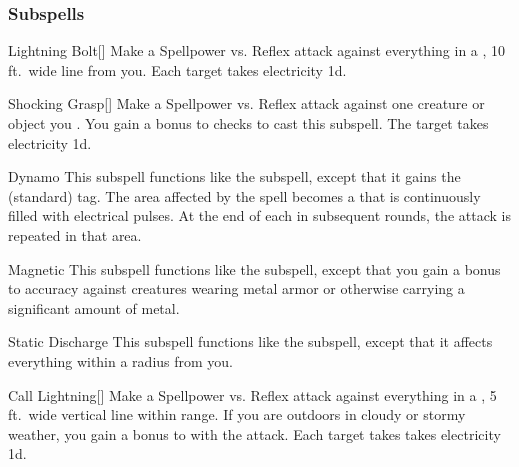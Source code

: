 \subsubsection{Subspells}


\begin{ability}[\nth{1}]{Lightning Bolt}[]
Make a Spellpower vs. Reflex attack against everything in a \arealarge, 10 ft.\ wide line from you.
\hit Each target takes electricity  \minus1d.
\end{ability}
\vspace{0.25em}


\begin{ability}[\nth{1}]{Shocking Grasp}[]
Make a Spellpower vs. Reflex attack against one creature or object you .
You gain a  bonus to  checks to cast this subspell.
\hit The target takes electricity  \plus1d.
\end{ability}
\vspace{0.25em}


\begin{ability}[\nth{2}]{Dynamo}
This subspell functions like the  subspell, except that it gains the  (standard) tag.
The area affected by the spell becomes a  that is continuously filled with electrical pulses.
At the end of each  in subsequent rounds, the attack is repeated in that area.
\end{ability}
\vspace{0.25em}


\begin{ability}[\nth{2}]{Magnetic}
This subspell functions like the  subspell, except that you gain a  bonus to accuracy against creatures wearing metal armor or otherwise carrying a significant amount of metal.
\end{ability}
\vspace{0.25em}


\begin{ability}[\nth{2}]{Static Discharge}
This subspell functions like the  subspell, except that it affects everything within a \areamed radius from you.
\end{ability}
\vspace{0.25em}


\begin{ability}[\nth{3}]{Call Lightning}[]
Make a Spellpower vs. Reflex attack against everything in a \arealarge, 5 ft.\ wide vertical line within \rngmed range.
If you are outdoors in cloudy or stormy weather, you gain a  bonus to  with the attack.
\hit Each target takes takes electricity  \plus1d.
\end{ability}
\vspace{0.25em}


